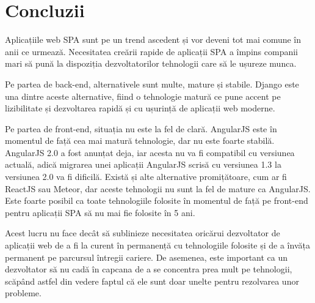 \chapter{Concluzii}

Aplicațiile web SPA sunt pe un trend ascedent și vor deveni tot mai
comune în anii ce urmează. Necesitatea creării rapide de aplicații SPA
a împins companii mari să pună la dispoziția dezvoltatorilor
tehnologii care să le ușureze munca.

Pe partea de back-end, alternativele sunt multe, mature și stabile.
Django este una dintre aceste alternative, fiind o tehnologie
matură ce pune accent pe lizibilitate și dezvoltarea rapidă și 
cu ușurință de aplicații web moderne.

Pe partea de front-end, situația nu este la fel de clară. AngularJS este
în momentul de față cea mai matură tehnologie, dar nu este foarte stabilă.
AngularJS 2.0 a fost anunțat deja, iar acesta nu va fi compatibil
cu versiunea actuală, adică migrarea unei aplicații AngularJS scrisă
cu versiunea 1.3 la versiunea 2.0 va fi dificilă. Există și alte
alternative promițătoare, cum ar fi ReactJS sau Meteor, 
dar aceste tehnologii nu sunt la fel de mature ca AngularJS.
Este foarte posibil ca toate tehnologiile folosite în momentul
de față pe front-end pentru aplicații SPA să nu mai fie folosite
în 5 ani.

Acest lucru nu face decât să sublinieze necesitatea oricărui
dezvoltator de aplicații web de a fi la curent în permanență
cu tehnologiile folosite și de a învăța permanent pe parcursul
întregii cariere. De asemenea, este important ca un dezvoltator
să nu cadă în capcana de a se concentra prea mult pe tehnologii,
scăpând astfel din vedere faptul că ele sunt doar unelte
pentru rezolvarea unor probleme.